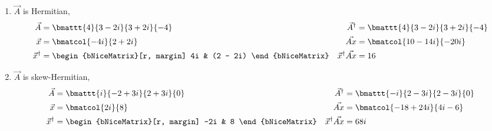 \begin{enumerate}
    \item $\vec{A}$ is Hermitian,
          \begin{align}
              \vec{A}               & = \bmattt{4}{3 - 2i}{3 + 2i}{-4} &
              \vec{A}^\dag          & = \bmattt{4}{3 - 2i}{3 + 2i}{-4}   \\
              \vec{x}               & = \bmatcol{-4i}{2 + 2i}          &
              \vec{Ax}              & = \bmatcol{10 - 14i}{-20i}         \\
              \vec{x}^\dag          & = \begin{bNiceMatrix}[r, margin]
                                            4i & (2 - 2i)
                                        \end{bNiceMatrix} &
              \vec{x}^\dag \vec{Ax} & = 16
          \end{align}

    \item $\vec{A}$ is skew-Hermitian,
          \begin{align}
              \vec{A}               & = \bmattt{i}{-2 + 3i}{2 + 3i}{0} &
              \vec{A}^\dag          & = \bmattt{-i}{2 - 3i}{2 - 3i}{0}   \\
              \vec{x}               & = \bmatcol{2i}{8}                &
              \vec{Ax}              & = \bmatcol{-18 + 24i}{4i - 6}      \\
              \vec{x}^\dag          & = \begin{bNiceMatrix}[r, margin]
                                            -2i & 8
                                        \end{bNiceMatrix} &
              \vec{x}^\dag \vec{Ax} & = 68i
          \end{align}


\end{enumerate}

